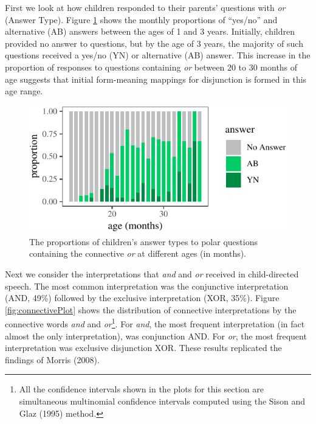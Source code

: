 \documentclass[floatsintext,man]{apa6}
\theoremstyle{definition}
\theoremstyle{definition}
\theoremstyle{definition}
\theoremstyle{remark}
\begin{document}
First we look at how children responded to their parents' questions with
\emph{or} (Answer Type). Figure \ref{fig:answerPlot} shows the monthly
proportions of \enquote{yes/no} and alternative (AB) answers between the
ages of 1 and 3 years. Initially, children provided no answer to
questions, but by the age of 3 years, the majority of such questions
received a yes/no (YN) or alternative (AB) answer. This increase in the
proportion of responses to questions containing \emph{or} between 20 to
30 months of age suggests that initial form-meaning mappings for
disjunction is formed in this age range.

\begin{figure}[tb]

{\centering \includegraphics{figs/answerPlot-1} 

}

\caption{The proportions of children's answer types to polar questions containing the connective \textit{or} at different ages (in months).}\label{fig:answerPlot}
\end{figure}

Next we consider the interpretations that \emph{and} and \emph{or}
received in child-directed speech. The most common interpretation was
the conjunctive interpretation (AND, 49\%) followed by the exclusive
interpretation (XOR, 35\%). Figure \ref{fig:connectivePlot} shows the
distribution of connective interpretations by the connective words
\emph{and} and \emph{or}\footnote{All the confidence intervals shown in
  the plots for this section are simultaneous multinomial confidence
  intervals computed using the Sison and Glaz (1995) method.}. For
\emph{and}, the most frequent interpretation (in fact almost the only
interpretation), was conjunction AND. For \emph{or}, the most frequent
interpretation was exclusive disjunction XOR. These results replicated
the findings of Morris (2008).
\end{document}
